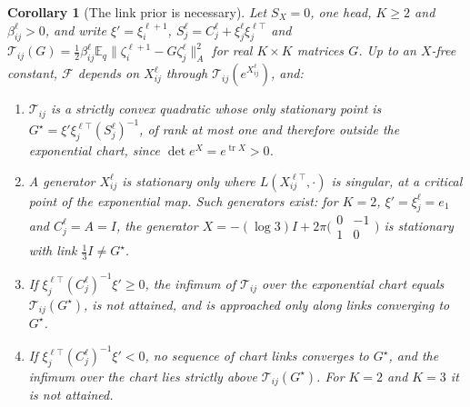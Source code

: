 \documentclass[11pt]{article}
\newtheorem{corollary}[theorem]{Corollary}
\theoremstyle{definition}
\theoremstyle{remark}
\providecommand{\tr}{\operatorname{tr}}
\newcommand{\E}{\mathbb E}
\begin{document}
\begin{corollary}[The link prior is necessary]
\label{dl:cor:prior}
Let $S_X=0$, one head, $K\ge2$ and $\beta_{ij}^\ell>0$, and write $\xi'=\xi_i^{\ell+1}$, $S_j^\ell=C_j^\ell+\xi_j^\ell\xi_j^{\ell\top}$ and $\mathcal T_{ij}(G)=\tfrac12\beta_{ij}^\ell\E_q\|\zeta_i^{\ell+1}-G\zeta_j^\ell\|_A^2$ for real $K\times K$ matrices $G$. Up to an $X$-free constant, $\mathcal F$ depends on $X_{ij}^\ell$ through $\mathcal T_{ij}(e^{X_{ij}^\ell})$, and:
\begin{enumerate}
\item[(i)] $\mathcal T_{ij}$ is a strictly convex quadratic whose only stationary point is $G^\star=\xi'\xi_j^{\ell\top}(S_j^\ell)^{-1}$, of rank at most one and therefore outside the exponential chart, since $\det e^X=e^{\tr X}>0$.
\item[(ii)] A generator $X_{ij}^\ell$ is stationary only where $L(X_{ij}^{\ell\top},\cdot)$ is singular, at a critical point of the exponential map. Such generators exist: for $K=2$, $\xi'=\xi_j^\ell=e_1$ and $C_j^\ell=A=I$, the generator $X=-(\log3)I+2\pi\bigl(\begin{smallmatrix}0&-1\\1&0\end{smallmatrix}\bigr)$ is stationary with link $\tfrac13I\ne G^\star$.
\item[(iii)] If $\xi_j^{\ell\top}(C_j^\ell)^{-1}\xi'\ge0$, the infimum of $\mathcal T_{ij}$ over the exponential chart equals $\mathcal T_{ij}(G^\star)$, is not attained, and is approached only along links converging to $G^\star$.
\item[(iv)] If $\xi_j^{\ell\top}(C_j^\ell)^{-1}\xi'<0$, no sequence of chart links converges to $G^\star$, and the infimum over the chart lies strictly above $\mathcal T_{ij}(G^\star)$. For $K=2$ and $K=3$ it is not attained.
\end{enumerate}
\end{corollary}
\end{document}
